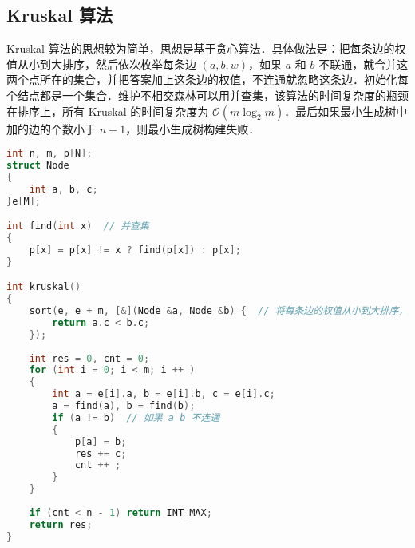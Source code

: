 \subsection{Kruskal 算法}

Kruskal 算法的思想较为简单，思想是基于贪心算法．具体做法是：把每条边的权值从小到大排序，然后依次枚举每条边 $(a,b,w)$，如果 $a$ 和 $b$ 不联通，就合并这两个点所在的集合，并把答案加上这条边的权值，不连通就忽略这条边．初始化每个结点都是一个集合．维护不相交森林可以用并查集，该算法的时间复杂度的瓶颈在排序上，所有 Kruskal 的时间复杂度为 $\mathcal{O}(m \log_2 m)$．最后如果最小生成树中加的边的个数小于 $n - 1$，则最小生成树构建失败．

\begin{lstlisting}[language=cpp]
int n, m, p[N];
struct Node
{
    int a, b, c;
}e[M];

int find(int x)  // 并查集
{
    p[x] = p[x] != x ? find(p[x]) : p[x];
}

int kruskal()
{
    sort(e, e + m, [&](Node &a, Node &b) {  // 将每条边的权值从小到大排序，这里使用了 Lambda
        return a.c < b.c;
    });
    
    int res = 0, cnt = 0;
    for (int i = 0; i < m; i ++ )
    {
        int a = e[i].a, b = e[i].b, c = e[i].c;
        a = find(a), b = find(b);
        if (a != b)  // 如果 a b 不连通
        {
            p[a] = b;
            res += c;
            cnt ++ ;
        }
    }
    
    if (cnt < n - 1) return INT_MAX;
    return res;
}


\end{lstlisting}